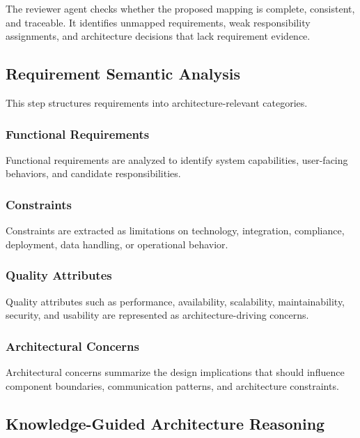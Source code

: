 The reviewer agent checks whether the proposed mapping is complete, consistent, and traceable.
It identifies unmapped requirements, weak responsibility assignments, and architecture decisions that lack requirement evidence.

\subsection{Requirement Semantic Analysis}
\label{sec:method-semantic-analysis}

This step structures requirements into architecture-relevant categories.

\subsubsection{Functional Requirements}
\label{sec:method-functional-requirements}

Functional requirements are analyzed to identify system capabilities, user-facing behaviors, and candidate responsibilities.

\subsubsection{Constraints}
\label{sec:method-constraints}

Constraints are extracted as limitations on technology, integration, compliance, deployment, data handling, or operational behavior.

\subsubsection{Quality Attributes}
\label{sec:method-quality-attributes}

Quality attributes such as performance, availability, scalability, maintainability, security, and usability are represented as architecture-driving concerns.

\subsubsection{Architectural Concerns}
\label{sec:method-architectural-concerns}

Architectural concerns summarize the design implications that should influence component boundaries, communication patterns, and architecture constraints.

\subsection{Knowledge-Guided Architecture Reasoning}
\label{sec:method-knowledge}

